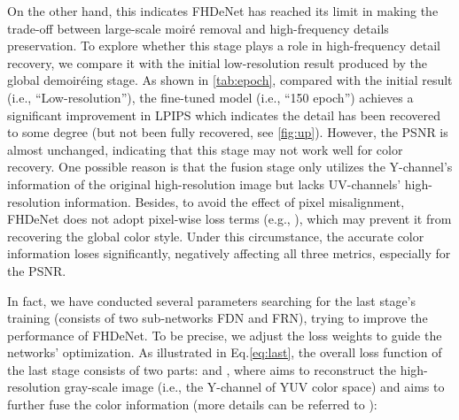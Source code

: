 \documentclass[runningheads]{llncs}
\newcommand{\ie}{i.e.}
\newcommand{\eg}{e.g.}
\begin{document}
On the other hand, this indicates FHDeNet has reached its limit in making the trade-off between large-scale moiré removal and high-frequency details preservation. To explore whether this stage plays a role in high-frequency detail recovery, we compare it with the initial low-resolution result produced by the global demoiréing stage. As shown in \cref{tab:epoch}, compared with the initial result (\ie,  ``Low-resolution''), the fine-tuned model (\ie,  ``150 epoch'') achieves a significant improvement in LPIPS which indicates the detail has been recovered to some degree (but not been fully recovered, see \cref{fig:up}). However, the PSNR is almost unchanged, indicating that this stage may not work well for color recovery. 
One possible reason is that the fusion stage only utilizes the Y-channel's information of the original high-resolution image but lacks UV-channels' high-resolution information. Besides, to avoid the effect of pixel misalignment, FHDeNet does not adopt pixel-wise loss terms (\eg, ), which may prevent it from recovering the global color style.  
Under this circumstance, the accurate color information loses significantly, negatively affecting all three metrics, especially for the PSNR. 


\begin{table}[H]
\caption{Quantitative results of different implementations of FHDeNet on UHDM dataset. ``Pre-train'' denotes the inference result by directly applying the official released pre-train model on FHDMi dataset~\cite{he2020fhde}, ``Low-resolution'' denotes the intermediate result produced by the first global demoiréing stage in FHDeNet}
\centering
{}

\label{tab:epoch}
\end{table}

In fact, we have conducted several parameters searching for the last stage's training (consists of two sub-networks FDN and FRN), trying to improve the performance of FHDeNet. To be precise, we adjust the loss weights to guide the networks' optimization. As illustrated in Eq.\eqref{eq:last}, the overall loss function of the last stage consists of two parts:  and , where  aims to reconstruct the high-resolution gray-scale image (\ie, the Y-channel of YUV color space) and  aims to further fuse the color information (more details can be referred to \cite{he2020fhde}): 
\end{document}
